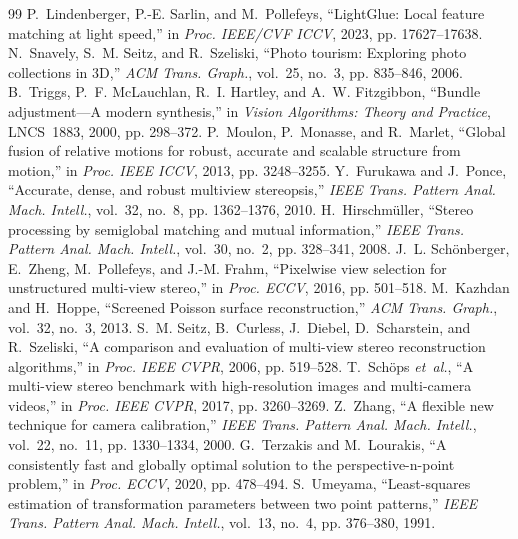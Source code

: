 \documentclass[conference,11pt]{IEEEtran}
\begin{document}
\begin{thebibliography}{99}
 P.~Lindenberger, P.-E. Sarlin, and M.~Pollefeys, ``LightGlue: Local feature matching at light speed,'' in \emph{Proc. IEEE/CVF ICCV}, 2023, pp. 17627--17638.
 N.~Snavely, S.~M. Seitz, and R.~Szeliski, ``Photo tourism: Exploring photo collections in 3D,'' \emph{ACM Trans. Graph.}, vol.~25, no.~3, pp. 835--846, 2006.
 B.~Triggs, P.~F. McLauchlan, R.~I. Hartley, and A.~W. Fitzgibbon, ``Bundle adjustment---A modern synthesis,'' in \emph{Vision Algorithms: Theory and Practice}, LNCS~1883, 2000, pp. 298--372.
 P.~Moulon, P.~Monasse, and R.~Marlet, ``Global fusion of relative motions for robust, accurate and scalable structure from motion,'' in \emph{Proc. IEEE ICCV}, 2013, pp. 3248--3255.
 Y.~Furukawa and J.~Ponce, ``Accurate, dense, and robust multiview stereopsis,'' \emph{IEEE Trans. Pattern Anal. Mach. Intell.}, vol.~32, no.~8, pp. 1362--1376, 2010.
 H.~Hirschm{\"u}ller, ``Stereo processing by semiglobal matching and mutual information,'' \emph{IEEE Trans. Pattern Anal. Mach. Intell.}, vol.~30, no.~2, pp. 328--341, 2008.
 J.~L. Sch{\"o}nberger, E.~Zheng, M.~Pollefeys, and J.-M. Frahm, ``Pixelwise view selection for unstructured multi-view stereo,'' in \emph{Proc. ECCV}, 2016, pp. 501--518.
 M.~Kazhdan and H.~Hoppe, ``Screened Poisson surface reconstruction,'' \emph{ACM Trans. Graph.}, vol.~32, no.~3, 2013.
 S.~M. Seitz, B.~Curless, J.~Diebel, D.~Scharstein, and R.~Szeliski, ``A comparison and evaluation of multi-view stereo reconstruction algorithms,'' in \emph{Proc. IEEE CVPR}, 2006, pp. 519--528.
 T.~Sch{\"o}ps \emph{et~al.}, ``A multi-view stereo benchmark with high-resolution images and multi-camera videos,'' in \emph{Proc. IEEE CVPR}, 2017, pp. 3260--3269.
 Z.~Zhang, ``A flexible new technique for camera calibration,'' \emph{IEEE Trans. Pattern Anal. Mach. Intell.}, vol.~22, no.~11, pp. 1330--1334, 2000.
 G.~Terzakis and M.~Lourakis, ``A consistently fast and globally optimal solution to the perspective-n-point problem,'' in \emph{Proc. ECCV}, 2020, pp. 478--494.
 S.~Umeyama, ``Least-squares estimation of transformation parameters between two point patterns,'' \emph{IEEE Trans. Pattern Anal. Mach. Intell.}, vol.~13, no.~4, pp. 376--380, 1991.
\end{thebibliography}
\end{document}
